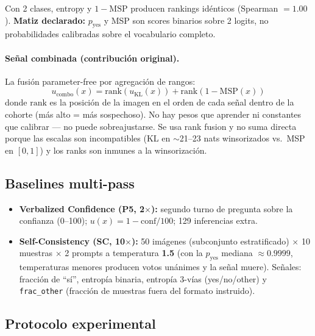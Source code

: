 \documentclass[12pt,a4paper]{article}
\newcommand{\ux}{u(x)}
\begin{document}
Con 2 clases, entropy y $1-\mathrm{MSP}$ producen rankings idénticos
(Spearman $= 1.00$). \textbf{Matiz declarado:} $p_{\mathrm{yes}}$ y MSP
son scores binarios sobre 2 logits, no probabilidades calibradas sobre el
vocabulario completo.

\paragraph{Señal combinada (contribución original).} La fusión
parameter-free por agregación de rangos:
\begin{equation}
u_{\mathrm{combo}}(x) = \mathrm{rank}\!\left(u_{\mathrm{KL}}(x)\right) +
\mathrm{rank}\!\left(1 - \mathrm{MSP}(x)\right)
\label{eq:combo}
\end{equation}
donde $\mathrm{rank}$ es la posición de la imagen en el orden de cada
señal dentro de la cohorte (más alto = más sospechoso). No hay pesos que
aprender ni constantes que calibrar --- no puede sobreajustarse. Se usa
rank fusion y no suma directa porque las escalas son incompatibles (KL en
$\sim$21--23 nats winsorizados vs.\ MSP en $[0,1]$) y los ranks son
inmunes a la winsorización.

\subsection{Baselines multi-pass}
\label{sec:baselines-mp}

\begin{itemize}[leftmargin=1.4em]
    \item \textbf{Verbalized Confidence (P5, 2$\times$):} segundo turno de
    pregunta sobre la confianza (0--100); $\ux = 1 - \mathrm{conf}/100$;
    129 inferencias extra.
    \item \textbf{Self-Consistency (SC, 10$\times$):} 50 imágenes
    (subconjunto estratificado) $\times$ 10 muestras $\times$ 2 prompts a
    temperatura \textbf{1.5} (con la $p_{\mathrm{yes}}$ mediana
    $\approx 0.9999$, temperaturas menores producen votos unánimes y la
    señal muere). Señales: fracción de ``sí'', entropía binaria, entropía
    3-vías (yes/no/other) y \texttt{frac\_other} (fracción de muestras
    fuera del formato instruido).
\end{itemize}

\subsection{Protocolo experimental}
\label{sec:protocolo}
\end{document}
